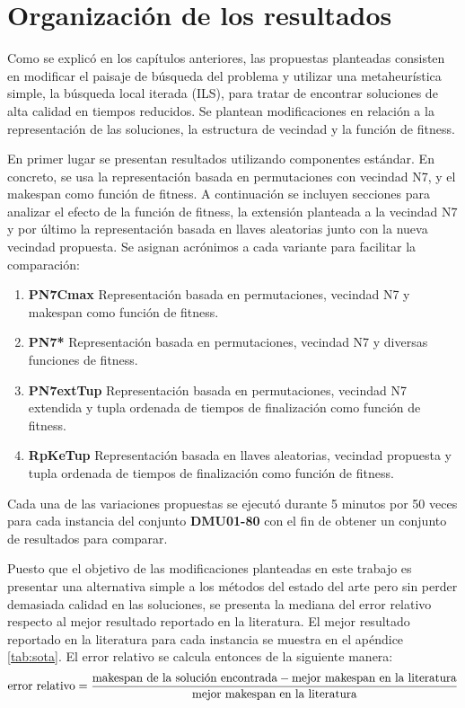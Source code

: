 \section{Organización de los resultados}
Como se explicó en los capítulos anteriores, las propuestas planteadas consisten en modificar el paisaje de búsqueda del problema y utilizar 
una metaheurística simple, la búsqueda local iterada (ILS), para tratar de encontrar soluciones de alta calidad en tiempos reducidos.
%
Se plantean modificaciones en relación a la representación de las soluciones, la estructura de vecindad y la función de fitness.

En primer lugar se presentan resultados utilizando componentes estándar. 
%
En concreto, se usa la representación basada en permutaciones con vecindad N7, y el makespan como función de fitness.
%
A continuación se incluyen secciones para analizar el efecto de la función de fitness, la extensión planteada a la vecindad N7 y por último 
la representación basada en llaves aleatorias junto con la nueva vecindad propuesta. 
%
Se asignan acrónimos a cada variante para facilitar la comparación:

\begin{enumerate}
    \item \textbf{PN7Cmax} Representación basada en permutaciones, vecindad N7 y makespan como función de fitness.
    \item \textbf{PN7*} Representación basada en permutaciones, vecindad N7 y diversas funciones de fitness.
    \item \textbf{PN7extTup} Representación basada en permutaciones, vecindad N7 extendida y tupla ordenada de tiempos de finalización como función de fitness.
    \item \textbf{RpKeTup} Representación basada en llaves aleatorias, vecindad propuesta y tupla ordenada de tiempos de finalización como función de fitness.
\end{enumerate}

Cada una de las variaciones propuestas se ejecutó durante 5 minutos por 50 veces para cada instancia del conjunto \textbf{DMU01-80} con el fin de obtener 
un conjunto de resultados para comparar.

Puesto que el objetivo de las modificaciones planteadas en este trabajo es presentar una alternativa simple a los métodos del estado del arte pero 
sin perder demasiada calidad en las soluciones, se presenta la mediana del error relativo respecto al mejor resultado reportado en la literatura. 
%
El mejor resultado reportado en la literatura para cada instancia se muestra en el apéndice \ref{tab:sota}.
%
El error relativo se calcula entonces de la siguiente 
manera: \[\text{error relativo}= \frac{\text{makespan de la solución encontrada}-\text{mejor makespan en la literatura}}{\text{\text{mejor makespan en la literatura}}}\]

